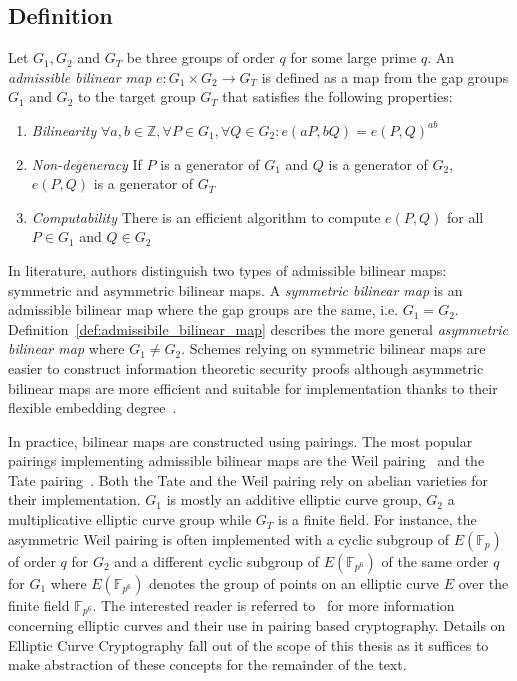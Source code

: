 \subsection{Definition}

\begin{defn}
\label{def:admissibile_bilinear_map}
 Let $G_1, G_2$ and $G_T$ be three groups of order $q$ for some large prime $q$. An \textit{admissible bilinear map} $e: G_1 \times G_2 \rightarrow G_T$ is defined as a map from the gap groups $G_1$ and $G_2$ to the target group $G_T$ that satisfies the following properties:
 \begin{enumerate}
  \item \textit{Bilinearity} $\forall a, b \in \mathbb{Z}, \forall P \in G_1, \forall Q \in G_2: e \left( aP, bQ \right) = e \left( P, Q \right)^{ab}$
  \item \textit{Non-degeneracy} If $P$ is a generator of $G_1$ and $Q$ is a generator of $G_2$, $e \left( P, Q \right)$ is a generator of $G_T$
  \item \textit{Computability} There is an efficient algorithm to compute $e \left( P, Q \right)$ for all $P \in G_1$ and $Q \in G_2$
 \end{enumerate}

\end{defn}

In literature, authors distinguish two types of admissible bilinear maps: symmetric and asymmetric bilinear maps. A \textit{symmetric bilinear map} is an admissible bilinear map where the gap groups are the same, i.e. $G_1 = G_2$. Definition~\ref{def:admissibile_bilinear_map} describes the more general \textit{asymmetric bilinear map} where $G_1 \neq G_2$. Schemes relying on symmetric bilinear maps are easier to construct information theoretic security proofs although asymmetric bilinear maps are more efficient and suitable for implementation thanks to their flexible embedding degree~\cite{art:BonehF01,art:ZhangW13}.

In practice, bilinear maps are constructed using pairings. The most popular pairings implementing admissible bilinear maps are the Weil pairing~\cite{art:BonehF01} and the Tate pairing~\cite{art:FreyMR99}. Both the Tate and the Weil pairing rely on abelian varieties for their implementation. $G_1$ is mostly an additive elliptic curve group, $G_2$ a multiplicative elliptic curve group while $G_T$ is a finite field. For instance, the asymmetric Weil pairing is often implemented with a cyclic subgroup of $E\left( \mathbb{F}_p \right)$ of order $q$ for $G_2$ and a different cyclic subgroup of $E \left( \mathbb{F}_{p^6} \right)$ of the same order $q$ for $G_1$ where $E\left( \mathbb{F}_{p^6} \right)$ denotes the group of points on an elliptic curve $E$ over the finite field $\mathbb{F}_{p^6}$. The interested reader is referred to~\cite{thesis:Maas04} for more information concerning elliptic curves and their use in pairing based cryptography. Details on Elliptic Curve Cryptography fall out of the scope of this thesis as it suffices to make abstraction of these concepts for the remainder of the text.


